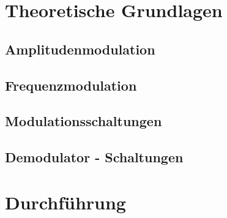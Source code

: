 \section{Theoretische Grundlagen}
\label{sec:theorie}


\subsection{Amplitudenmodulation}
\label{subsec:klassisch}


\subsection{Frequenzmodulation}
\label{subsec:einstein}


\subsection{Modulationsschaltungen}
\label{subsec:debye}

\subsection{Demodulator - Schaltungen}
\label{subsec:debye}

\section{Durchführung}
\label{sec:durchführung}
